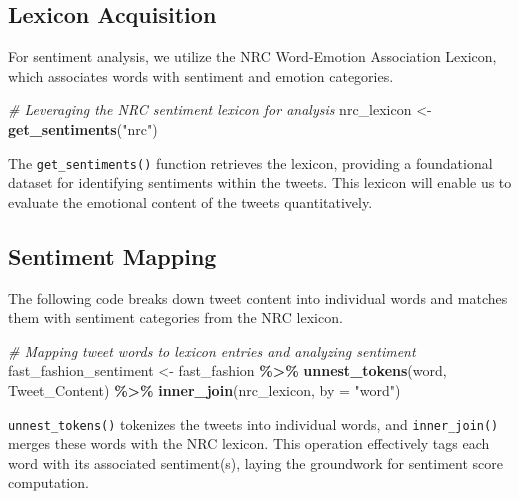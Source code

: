 \documentclass[
]{book}
\newenvironment{Shaded}{\begin{snugshade}}{\end{snugshade}}
\newcommand{\AttributeTok}[1]{\textcolor[rgb]{0.13,0.29,0.53}{#1}}
\newcommand{\CommentTok}[1]{\textcolor[rgb]{0.56,0.35,0.01}{\textit{#1}}}
\newcommand{\FunctionTok}[1]{\textcolor[rgb]{0.13,0.29,0.53}{\textbf{#1}}}
\newcommand{\NormalTok}[1]{#1}
\newcommand{\OtherTok}[1]{\textcolor[rgb]{0.56,0.35,0.01}{#1}}
\newcommand{\SpecialCharTok}[1]{\textcolor[rgb]{0.81,0.36,0.00}{\textbf{#1}}}
\newcommand{\StringTok}[1]{\textcolor[rgb]{0.31,0.60,0.02}{#1}}
\begin{document}
\hypertarget{lexicon-acquisition}{%
\subsection{Lexicon Acquisition}\label{lexicon-acquisition}}

For sentiment analysis, we utilize the NRC Word-Emotion Association Lexicon, which associates words with sentiment and emotion categories.

\begin{Shaded}
\begin{Highlighting}[]
\CommentTok{\# Leveraging the NRC sentiment lexicon for analysis}
\NormalTok{nrc\_lexicon }\OtherTok{\textless{}{-}} \FunctionTok{get\_sentiments}\NormalTok{(}\StringTok{"nrc"}\NormalTok{) }
\end{Highlighting}
\end{Shaded}

The \texttt{get\_sentiments()} function retrieves the lexicon, providing a foundational dataset for identifying sentiments within the tweets. This lexicon will enable us to evaluate the emotional content of the tweets quantitatively.

\hypertarget{sentiment-mapping}{%
\subsection{Sentiment Mapping}\label{sentiment-mapping}}

The following code breaks down tweet content into individual words and matches them with sentiment categories from the NRC lexicon.

\begin{Shaded}
\begin{Highlighting}[]
\CommentTok{\# Mapping tweet words to lexicon entries and analyzing sentiment}
\NormalTok{fast\_fashion\_sentiment }\OtherTok{\textless{}{-}}\NormalTok{ fast\_fashion }\SpecialCharTok{\%\textgreater{}\%}
  \FunctionTok{unnest\_tokens}\NormalTok{(word, Tweet\_Content) }\SpecialCharTok{\%\textgreater{}\%}
  \FunctionTok{inner\_join}\NormalTok{(nrc\_lexicon, }\AttributeTok{by =} \StringTok{"word"}\NormalTok{)}
\end{Highlighting}
\end{Shaded}

\texttt{unnest\_tokens()} tokenizes the tweets into individual words, and \texttt{inner\_join()} merges these words with the NRC lexicon. This operation effectively tags each word with its associated sentiment(s), laying the groundwork for sentiment score computation.
\end{document}
